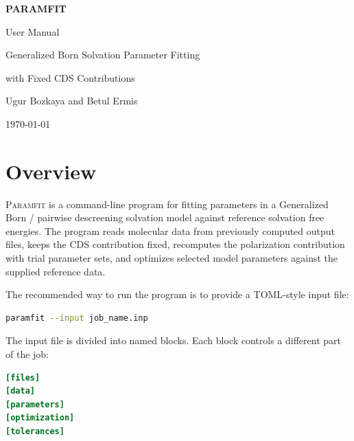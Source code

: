 \documentclass[11pt]{article}
\begin{document}
\hypersetup{pageanchor=false}
\begin{titlepage}
\thispagestyle{empty}
\centering
\vspace*{0.18\textheight}

{\Huge\bfseries PARAMFIT\par}
\vspace{0.8cm}
{\LARGE User Manual\par}
\vspace{1.2cm}
{\Large Generalized Born Solvation Parameter Fitting\par}
\vspace{0.25cm}
{\Large with Fixed CDS Contributions\par}

\vspace{2.4cm}

{\Large Ugur Bozkaya and Betul Ermis\par}
\vspace{1.0cm}
{\large \today\par}

\vfill
\end{titlepage}

\hypersetup{pageanchor=true}
\newpage
\tableofcontents
\newpage
{}

\section{Overview}

\textsc{Paramfit} is a command-line program for fitting parameters in a
Generalized Born / pairwise descreening solvation model against reference
solvation free energies. The program reads molecular data from previously
computed output files, keeps the CDS contribution fixed, recomputes the
polarization contribution with trial parameter sets, and optimizes selected
model parameters against the supplied reference data.

The recommended way to run the program is to provide a TOML-style input file:

\begin{lstlisting}[language=bash]
paramfit --input job_name.inp
\end{lstlisting}

The input file is divided into named blocks. Each block controls a different
part of the job:

\begin{lstlisting}[language=toml]
[files]
[data]
[parameters]
[optimization]
[tolerances]
\end{lstlisting}
\end{document}

